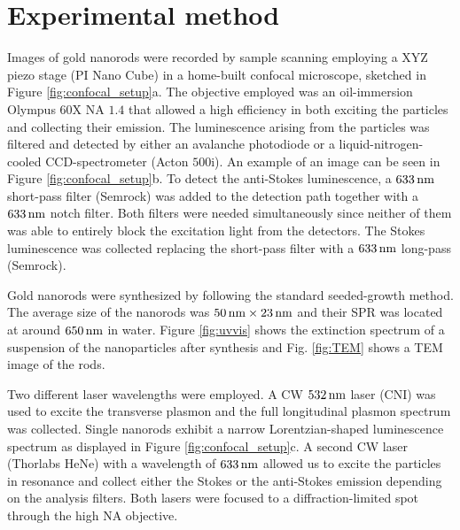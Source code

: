 \section{Experimental method}
Images of gold nanorods were recorded by sample scanning employing a XYZ piezo
stage (PI Nano Cube) in a  home-built confocal microscope, sketched in Figure
\ref{fig:confocal_setup}a. The objective employed was an oil-immersion Olympus
60X NA $1.4$ that allowed a high efficiency in both exciting the particles and
collecting their emission. The luminescence arising from the particles was
filtered and detected by either an avalanche photodiode or a
liquid-nitrogen-cooled CCD-spectrometer (Acton $500\textrm{i}$). An example of
an image can be seen in Figure \ref{fig:confocal_setup}b. To detect the
anti-Stokes luminescence, a $633\,\textrm{nm}$ short-pass filter (Semrock) was added to the detection
path together with a $633\,\textrm{nm}$ notch filter. Both filters were needed
simultaneously since neither of them was able to entirely block the excitation
light from the detectors. The Stokes luminescence was collected replacing the
short-pass filter with a $633\,\textrm{nm}$ long-pass (Semrock).

Gold nanorods were synthesized by following the standard seeded-growth
method\cite{Nikoobakht2003}. The average size of the nanorods was $50\,\textrm{nm}\times
23\,\textrm{nm}$ and their SPR was located at around $650\,\textrm{nm}$ in water. Figure
\ref{fig:uvvis} shows the extinction spectrum of a suspension of the
nanoparticles after synthesis and Fig. \ref{fig:TEM} shows a TEM image of the
rods.

Two different laser wavelengths were employed. A CW $532\,\textrm{nm}$ laser
(CNI) was used to excite the transverse plasmon and the full longitudinal
plasmon spectrum was collected. Single nanorods exhibit a narrow
Lorentzian-shaped luminescence spectrum as displayed in Figure
\ref{fig:confocal_setup}c.
A second CW laser (Thorlabs HeNe) with a wavelength of $633\,\textrm{nm}$ allowed
us to excite the particles in resonance and collect either the Stokes or the
anti-Stokes emission depending on the analysis filters. Both lasers
were focused to a diffraction-limited spot through the high NA objective.

